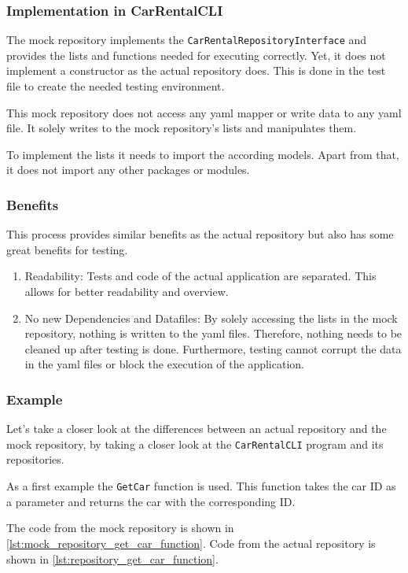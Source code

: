 \subsubsection*{Implementation in CarRentalCLI}
The mock repository implements the \texttt{CarRentalRepositoryInterface} and provides the lists and functions needed for executing correctly.
Yet, it does not implement a constructor as the actual repository does.
This is done in the test file to create the needed testing environment.

This mock repository does not access any yaml mapper or write data to any yaml file.
It solely writes to the mock repository's lists and manipulates them.

To implement the lists it needs to import the according models.
Apart from that, it does not import any other packages or modules.

\subsubsection*{Benefits}
This process provides similar benefits as the actual repository but also has some great benefits for testing.
\begin{enumerate}
    \item Readability: Tests and code of the actual application are separated.
          This allows for better readability and overview.
    \item No new Dependencies and Datafiles: By solely accessing the lists in the mock repository, nothing is written to the yaml files.
          Therefore, nothing needs to be cleaned up after testing is done.
          Furthermore, testing cannot corrupt the data in the yaml files or block the execution of the application.
\end{enumerate}

\subsubsection*{Example}
Let's take a closer look at the differences between an actual repository and the mock repository, by taking a closer look at the \texttt{CarRentalCLI} program and its repositories.

As a first example the \texttt{GetCar} function is used.
This function takes the car ID as a parameter and returns the car with the corresponding ID.

The code from the mock repository is shown in \autoref{lst:mock_repository_get_car_function}.
Code from the actual repository is shown in \autoref{lst:repository_get_car_function}.

